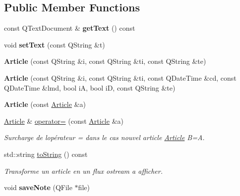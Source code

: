 \subsection*{Public Member Functions}
\begin{DoxyCompactItemize}
\item 
\mbox{\label{class_article_a6620c09453a87251bf312d1c7b9e4112}} 
const Q\+Text\+Document \& {\bfseries get\+Text} () const
\item 
\mbox{\label{class_article_a7144942027b1761cfcbd21761dd5cee8}} 
void {\bfseries set\+Text} (const Q\+String \&t)
\item 
\mbox{\label{class_article_af3f6b98ba3cc46aaa5625a17266eb67f}} 
{\bfseries Article} (const Q\+String \&i, const Q\+String \&ti, const Q\+String \&te)
\item 
\mbox{\label{class_article_a067e635213e9ff6b93fd8f88e471652f}} 
{\bfseries Article} (const Q\+String \&i, const Q\+String \&ti, const Q\+Date\+Time \&cd, const Q\+Date\+Time \&lmd, bool iA, bool iD, const Q\+String \&te)
\item 
\mbox{\label{class_article_a77eaa1a87e24eec7788f438a30ff162f}} 
{\bfseries Article} (const \hyperlink{class_article}{Article} \&a)
\item 
\mbox{\label{class_article_ae4059abc035598ff3faf554fd74a1492}} 
\hyperlink{class_article}{Article} \& \hyperlink{class_article_ae4059abc035598ff3faf554fd74a1492}{operator=} (const \hyperlink{class_article}{Article} \&a)
\begin{DoxyCompactList}\small\item\em Surcharge de l\textquotesingle{}opérateur = dans le cas nouvel article \hyperlink{class_article}{Article} B=A. \end{DoxyCompactList}\item 
std\+::string \hyperlink{class_article_ae40d268ecffbaaa549968a81ea609ba4}{to\+String} () const
\begin{DoxyCompactList}\small\item\em Transforme un article en un flux ostream a afficher. \end{DoxyCompactList}\item 
\mbox{\label{class_article_a83c6688e4886b871938b9dca34e78041}} 
void {\bfseries save\+Note} (Q\+File $\ast$file)
\end{DoxyCompactItemize}
